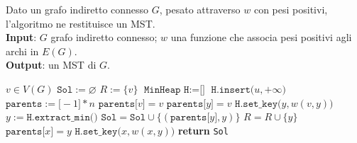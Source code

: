 \documentclass[a4paper, 12pt]{report}
\begin{document}
    \begin{algorithm}[H]
        \caption{
            Dato un grafo indiretto connesso $G$, pesato attraverso $w$ con pesi positivi, l'algoritmo ne restituisce un MST.\\
            \textbf{Input}: $G$ grafo indiretto connesso; $w$ una funzione che associa pesi positivi agli archi in $E(G)$.\\
            \textbf{Output}: un MST di $G$.
        }

        \begin{algorithmic}[1]
                \State $v \in V(G)$
                \State $\texttt{Sol} := \varnothing$
                \State $R := \{v\}$
                \State $\texttt{MinHeap H} := \texttt{[]}$
                    \State $\texttt{H.insert(}u, +\infty\texttt{)}$
                \EndFor
                \State $\texttt{parents} := \texttt{[}-1\texttt{]} * n$
                \State $\texttt{parents[}v\texttt{]} = v$
                    \State $\texttt{parents[}y\texttt{]} = v$
                    \State $\texttt{H.set\_key(}y, w(v, y)\texttt{)}$
                \EndFor
                    \State $y := \texttt{H.extract\_min()}$ 
                        \State $\texttt{Sol} = \texttt{Sol} \cup \{ (\texttt{parents[}y\texttt{]}, y) \}$
                    \State $R = R \cup \{y\}$
                            \State $\texttt{parents[}x\texttt{]} = y$
                            \State $\texttt{H.set\_key(}x, w(x, y)\texttt{)}$
                        \EndIf
                    \EndFor
                \EndWhile
                \State \textbf{return} \texttt{Sol}
            \EndFunction
        \end{algorithmic}
    \end{algorithm}
\end{document}
